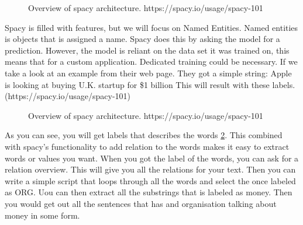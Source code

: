 \begin{figure}[h]
    \caption{Overview of spacy architecture. https://spacy.io/usage/spacy-101}
    \label{fig:architecture}
\end{figure}

Spacy is filled with features, but we will focus on Named Entities.
Named entities is objects that is assigned a name.
Spacy does this by asking the model for a prediction.
However, the model is reliant on the data set it was trained on, this means that for a custom application.
Dedicated training could be necessary.
If we take a look at an example from their web page.
They got a simple string: Apple is looking at buying U.K. startup for \$1 billion
This will result with these labels. (https://spacy.io/usage/spacy-101)

\begin{figure}[h]
    \caption{Overview of spacy architecture. https://spacy.io/usage/spacy-101}
    \label{fig:label image}
\end{figure}

As you can see, you will get labels that describes the words \ref{fig:label image}.
This combined with spacy's functionality to add relation to the words makes it easy to extract words or values you want.
When you got the label of the words, you can ask for a relation overview.
This will give you all the relations for your text.
Then you can write a simple script that loops through all the words and select the once labeled as ORG. Uou can then extract all the substrings that is labeled as money.
Then you would get out all the sentences that has and organisation talking about money in some form. 







